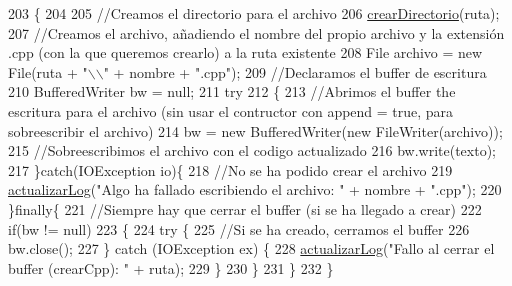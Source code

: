 \begin{DoxyCode}
203                                                                    \{
204         
205         \textcolor{comment}{//Creamos el directorio para el archivo}
206         \mbox{\hyperlink{classactualizadordoxy_1_1_actualizador_doxy_a7d8af20d53904ac818f04740c5264d9f}{crearDirectorio}}(ruta);
207         \textcolor{comment}{//Creamos el archivo, añadiendo el nombre del propio archivo y la extensión .cpp (con la que
       queremos crearlo) a la ruta existente}
208         File archivo = \textcolor{keyword}{new} File(ruta + \textcolor{stringliteral}{"\(\backslash\)\(\backslash\)"} + nombre + \textcolor{stringliteral}{".cpp"});
209         \textcolor{comment}{//Declaramos el buffer de escritura}
210         BufferedWriter bw = null;
211         \textcolor{keywordflow}{try}
212         \{
213             \textcolor{comment}{//Abrimos el buffer the escritura para el archivo (sin usar el contructor con append = true,
       para sobreescribir el archivo)}
214             bw = \textcolor{keyword}{new} BufferedWriter(\textcolor{keyword}{new} FileWriter(archivo));
215             \textcolor{comment}{//Sobreescribimos el archivo con el codigo actualizado}
216             bw.write(texto);
217         \}\textcolor{keywordflow}{catch}(IOException io)\{
218             \textcolor{comment}{//No se ha podido crear el archivo}
219             \mbox{\hyperlink{classactualizadordoxy_1_1_actualizador_doxy_a1ad41046efbaaf40a60b34da347f9090}{actualizarLog}}(\textcolor{stringliteral}{"Algo ha fallado escribiendo el archivo: "} + nombre + \textcolor{stringliteral}{".cpp"});
220         \}\textcolor{keywordflow}{finally}\{
221             \textcolor{comment}{//Siempre hay que cerrar el buffer (si se ha llegado a crear)}
222             \textcolor{keywordflow}{if}(bw != null)
223             \{
224                 \textcolor{keywordflow}{try} \{
225                     \textcolor{comment}{//Si se ha creado, cerramos el buffer}
226                     bw.close();
227                 \} \textcolor{keywordflow}{catch} (IOException ex) \{
228                     \mbox{\hyperlink{classactualizadordoxy_1_1_actualizador_doxy_a1ad41046efbaaf40a60b34da347f9090}{actualizarLog}}(\textcolor{stringliteral}{"Fallo al cerrar el buffer (crearCpp): "} + ruta);
229                 \}
230             \}
231         \}
232     \}
\end{DoxyCode}
\mbox{\label{classactualizadordoxy_1_1_actualizador_doxy_a7d8af20d53904ac818f04740c5264d9f}} 
